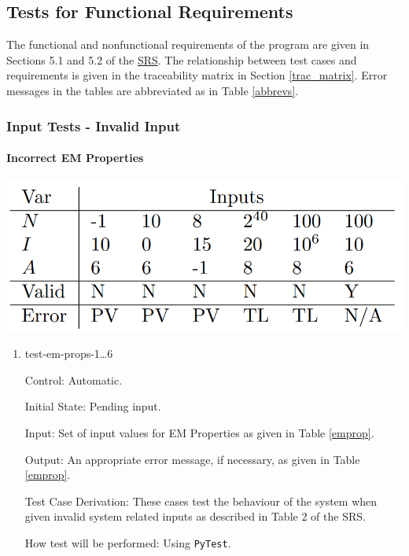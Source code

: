\documentclass[12pt, titlepage]{article}
\begin{document}
\subsection{Tests for Functional Requirements}
The functional and nonfunctional requirements of the program are given in Sections 5.1 and 5.2 of the \href{https://github.com/husseinsd1/optimal-em-arrangement/blob/main/docs/SRS/SRS.pdf}{SRS}. The relationship between test cases and requirements is given in the traceability matrix in Section \ref{trac_matrix}. Error messages in the tables are abbreviated as in Table \ref{abbrevs}.

\subsubsection{Input Tests - Invalid Input}

		
\paragraph{Incorrect EM Properties}
\begin{center}
  \includegraphics[scale=0.4]{EMInputTable.PNG} \\
  \label{emprop}
\end{center}

\begin{enumerate}

\item{test-em-props-1\dots6\\}

Control: Automatic.
					
Initial State: Pending input.
					
Input: Set of input values for EM Properties as given in Table \ref{emprop}.
					
Output: An appropriate error message, if necessary, as given in Table \ref{emprop}.

Test Case Derivation: These cases test the behaviour of the system when given invalid system related inputs as described in Table 2 of the SRS.
					
How test will be performed: Using \texttt{PyTest}. 
\end{enumerate}
\end{document}
